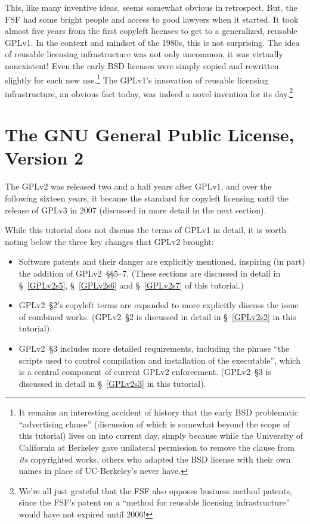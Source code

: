 This, like many inventive ideas, seems somewhat obvious in retrospect.  But,
the FSF had some bright people and access to good lawyers when it started.
It took almost five years from the first copyleft licenses to get to a
generalized, reusable GPLv1.  In the context and mindset of the 1980s, this
is not surprising.  The idea of reusable licensing infrastructure was not
only uncommon, it was virtually nonexistent!  Even the early BSD licenses
were simply copied and rewritten slightly for each new use.\footnote{It
  remains an interesting accident of history that the early BSD problematic
  ``advertising clause'' (discussion of which is somewhat beyond the scope of
  this tutorial) lives on into current day, simply because while the
  University of California at Berkeley gave unilateral permission to remove
  the clause from \textit{its} copyrighted works, others who adapted the BSD
  license with their own names in place of UC-Berkeley's never have.}  The
GPLv1's innovation of reusable licensing infrastructure, an obvious fact
today, was indeed a novel invention for its day.\footnote{We're all just
  grateful that the FSF also opposes business method patents, since the FSF's
  patent on a ``method for reusable licensing infrastructure'' would have
  not expired until 2006!}

\section{The GNU General Public License, Version 2}

The GPLv2 was released two and a half years after GPLv1, and over the
following sixteen years, it became the standard for copyleft licensing until
the release of GPLv3 in 2007 (discussed in more detail in the next section).

While this tutorial does not discuss the terms of GPLv1 in detail, it is
worth noting below the three key changes that GPLv2 brought:

\begin{itemize}

\item Software patents and their danger are explicitly mentioned, inspiring
  (in part) the addition of GPLv2~\S\S5--7.  (These sections are discussed in
  detail in \S~\ref{GPLv2s5}, \S~\ref{GPLv2s6} and \S~\ref{GPLv2s7} of this
  tutorial.)

\item GPLv2~\S2's copyleft terms are expanded to more explicitly discuss the
  issue of combined works.  (GPLv2~\S2 is discussed in detail in
  \S~\ref{GPLv2s2} in this tutorial).

\item GPLv2~\S3 includes more detailed requirements, including the phrase
 ``the scripts used to control compilation and installation of the
  executable'', which is a central component of current GPLv2 enforcement.
  (GPLv2~\S3 is discussed in detail in
  \S~\ref{GPLv2s3} in this tutorial).
\end{itemize}

